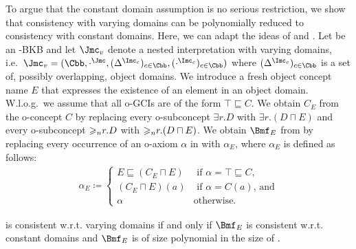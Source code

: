 \noindent
To argue that the constant domain assumption is no serious restriction, we show that consistency
with varying domains can be polynomially reduced to consistency with constant domains. Here, we can adapt
the ideas of \cite{GKW+-03} and \cite{LuWZ-TIME08}. Let \Bmf be an \LMLO-BKB and let $\J_{v}$ denote a nested
interpretation with varying domains, i.e.\
$\J_{v} = (\Cbb,\cdot^{\J},(\Delta^{\I_{c}})_{c\in\Cbb},(\cdot^{\I_c})_{c\in\Cbb})$ where
$(\Delta^{\I_{c}})_{c\in\Cbb}$ is a set of, possibly overlapping, object domains. We introduce a
fresh object concept name $E$ that expresses the existence of an element in an object
domain. W.l.o.g.\ we assume that all o-GCIs are of the form $\top \sqsubseteq C$. We obtain $C_{E}$
from the o-concept $C$ by replacing every o-subconcept $\exists r.D$ with $\exists r.(D \sqcap
E)$ and every o-subconcept ${\geqslant_{n}}r.D$ with ${\geqslant_{n}}r.(D \sqcap E)$. We
obtain $\Bmf_{E}$ from \Bmf by replacing  every occurrence of an o-axiom $\alpha$ in \Bmf with
$\alpha_{E}$, where $\alpha_{E}$ is defined as follows:
\begin{align*}
  \alpha_{E} \coloneqq
  \begin{cases}
    E \sqsubseteq (C_{E} \sqcap E) & \text{ if $\alpha = \top \sqsubseteq C$,} \\
    (C_{E}\sqcap E)(a) & \text{ if $\alpha = C(a)$, and} \\
    \alpha & \text{otherwise.}
  \end{cases}
\end{align*}
%
\begin{proposition}\label{prop:constant-domain-assumption}
  \Bmf is consistent w.r.t. varying domains if and only if $\Bmf_{E}$ is consistent w.r.t. constant
  domains and $\Bmf_{E}$ is of size polynomial in the size of \Bmf.
\end{proposition}

